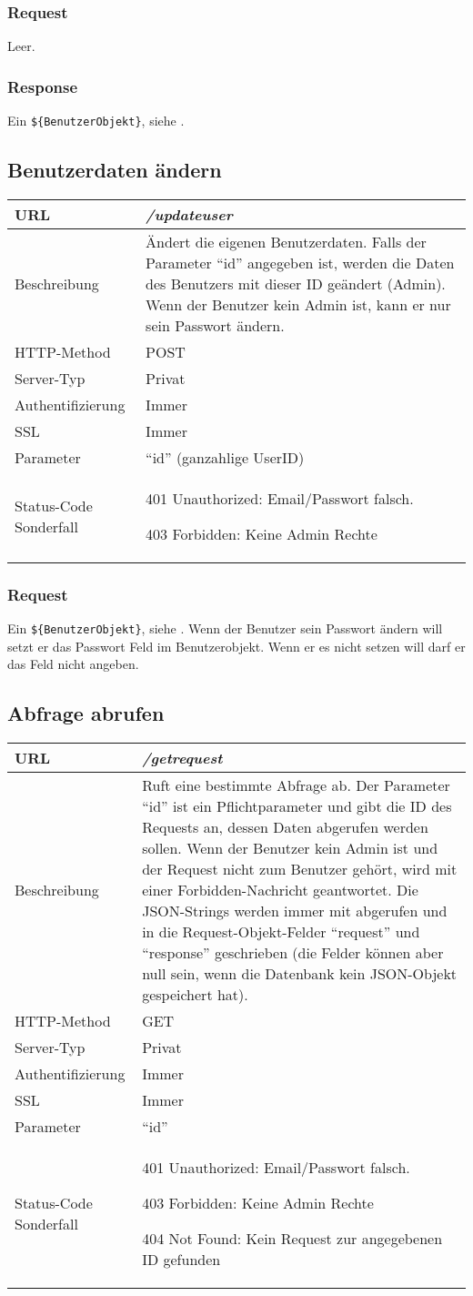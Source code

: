 \documentclass[ngerman,titlepage,parskip=true]{scrartcl}
\newcommand{\requestURL}[1]{\textit{#1}}
\newcommand{\request}[9]
{\subsection{#1}
\begin{tabular}{|p{0.2\textwidth}|p{0.7\textwidth}|}
\hline
  URL & \requestURL{#2}\\\hline
    Beschreibung & #3\\\hline
  HTTP-Method & #4\\\hline
  Server-Typ & #5\\\hline
  Authentifizierung & #6\\\hline
  SSL & #7\\\hline
  Parameter & #8\\\hline
  Status-Code Sonderfall & #9\\\hline
 \end{tabular}\vspace*{1em}}
{}%
{}%
{}%
{}%
{}%
{}%
{}%
{}%
\begin{document}
\subsubsection{Request}
Leer.
\subsubsection{Response}
Ein \texttt{\$\{BenutzerObjekt\}}, siehe .
\clearpage


\request{Benutzerdaten ändern}%
{/updateuser}%
{Ändert die eigenen Benutzerdaten. Falls der Parameter ``id'' angegeben ist, werden die Daten des Benutzers mit dieser ID geändert (Admin). Wenn der Benutzer kein Admin ist, kann er nur sein Passwort ändern.}%
{POST}%
{Privat}%
{Immer}%
{Immer}%
{``id'' (ganzahlige UserID)}%
{401 Unauthorized: Email/Passwort falsch.\par
 403 Forbidden: Keine Admin Rechte}%
\subsubsection{Request}
Ein \texttt{\$\{BenutzerObjekt\}}, siehe .
Wenn der Benutzer sein Passwort ändern will setzt er das Passwort Feld im Benutzerobjekt. Wenn er es nicht setzen will darf er das Feld nicht angeben.
\clearpage

\request{Abfrage abrufen}%
{/getrequest}%
{Ruft eine bestimmte Abfrage ab. Der Parameter ``id'' ist ein Pflichtparameter und gibt die ID des Requests an, dessen Daten abgerufen werden sollen. Wenn der Benutzer kein Admin ist und der Request nicht zum Benutzer gehört, wird mit einer Forbidden-Nachricht geantwortet. Die JSON-Strings werden immer mit abgerufen und in die Request-Objekt-Felder \mbox{``request''} und \mbox{``response''} geschrieben (die Felder können aber null sein, wenn die Datenbank kein JSON-Objekt gespeichert hat).
}%
{GET}%
{Privat}%
{Immer}%
{Immer}%
{``id''}%
{401 Unauthorized: Email/Passwort falsch.\par
 403 Forbidden: Keine Admin Rechte\par
404 Not Found: Kein Request zur angegebenen ID gefunden}%
\end{document}
